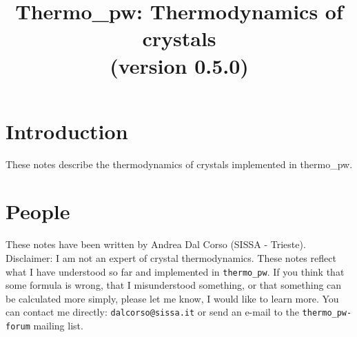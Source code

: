 \documentclass[12pt,a4paper]{article}
\def\version{0.5.0}
\def\tpw{{\sc thermo\_pw}}
\begin{document}
 
\author{}
\date{}


\title{
  \vskip 1cm
  {\color{red} \Huge Thermo\_pw: Thermodynamics of crystals} \\
  \Large (version \version)
}

\maketitle

\tableofcontents

\newpage

\section{{\color{coral}Introduction}}
These notes describe the thermodynamics of crystals implemented in \tpw. 

\section{\color{coral}People}
These notes have been written by Andrea Dal Corso (SISSA - Trieste). \\
Disclaimer: I am not an expert of crystal thermodynamics. 
These notes reflect what I have understood so far and implemented in 
\texttt{thermo\_pw}. If you think that some formula is wrong, 
that I misunderstood something, or that something can be calculated more 
simply, please let me know, I would like to learn more. 
You can contact me directly: \texttt{dalcorso@sissa.it} or send an
e-mail to the \texttt{thermo\_pw-forum} mailing list.
\end{document}
